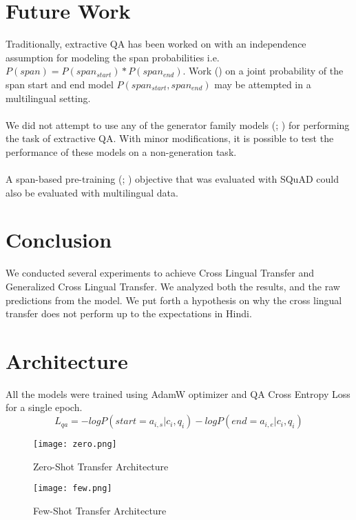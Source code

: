 \documentclass[12pt]{article}   %
\begin{document}
\section{Future Work}
Traditionally, extractive QA has been worked on with an independence assumption for modeling the span probabilities i.e. $P(span) = P(span_{start}) * P(span_{end})$. Work (\cite{fajcik-etal-2021-rethinking}) on a joint probability of the span start and end model $P(span_{start}, span_{end})$ may be attempted in a multilingual setting.
\\ \\
We did not attempt to use any of the generator family models (\cite{xue-etal-2021-mt5}; \cite{dabre-etal-2022-indicbart}) for performing the task of extractive QA. With minor modifications, it is possible to test the performance of these models on a non-generation task.
\\ \\
A span-based pre-training (\cite{ram-etal-2021-shot}; \cite{glass-etal-2020-span}) objective that was evaluated with SQuAD could also be evaluated with multilingual data.

\section{Conclusion}
We conducted several experiments to achieve Cross Lingual Transfer and Generalized Cross Lingual Transfer. We analyzed both the results, and the raw predictions from the model. We put forth a hypothesis on why the cross lingual transfer does not perform up to the expectations in Hindi.



\newpage
\appendix
\section{Architecture}
\label{appendix:arch}
All the models were trained using AdamW optimizer and QA Cross Entropy Loss for a single epoch.
\begin{equation} \label{mml}
	L_{qa} = - log P(start = a_{i, s}|c_{i}, q_{i}) - log P(end = a_{i, e}|c_{i}, q_{i})
\end{equation}

\begin{figure}[H]
\centering
\texttt{[image: zero.png]}
\caption{Zero-Shot Transfer Architecture}
\label{fig:zero}
\end{figure}

\begin{figure}[H]
\centering
\texttt{[image: few.png]}
\caption{Few-Shot Transfer Architecture}
\label{fig:few}
\end{figure}
\end{document}
